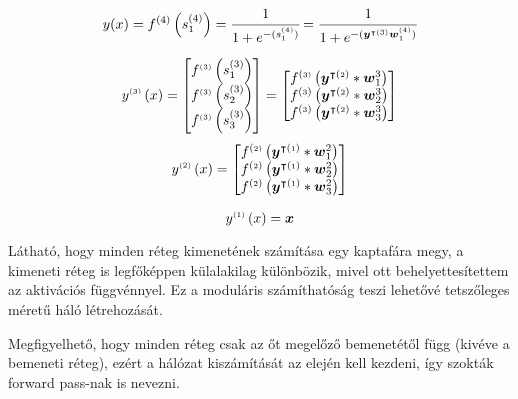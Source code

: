 \begin{equation}
    y(x) = f^{(4)}\left(s^{(4)}_1\right) = \cfrac{1}{1+e^{-(s^{(4)}_1)}} = \cfrac{1}{1+e^{-(\boldsymbol y^{\intercal {\scriptscriptstyle(3)}}\boldsymbol w^{{\scriptscriptstyle(4)}}_1)}}
\end{equation}

\begin{equation}
    y^{{\scriptscriptstyle(3)}}\left(x\right) =
    \begin{bmatrix}
    f^{{\scriptscriptstyle(3)}}\left(s^{(3)}_1\right) \\
    f^{{\scriptscriptstyle(3)}}\left(s^{(3)}_2\right) \\
    f^{{\scriptscriptstyle(3)}}\left(s^{(3)}_3\right)
    \end{bmatrix}
     = 
    \begin{bmatrix}
    f^{({\scriptscriptstyle3)}}\left(\boldsymbol y^{\intercal({\scriptscriptstyle2})}*\boldsymbol w^{3}_1\right) \\
    f^{({\scriptscriptstyle3})}\left(\boldsymbol y^{\intercal({\scriptscriptstyle2})}*\boldsymbol w^{3}_2\right) \\
    f^{({\scriptscriptstyle3})}\left(\boldsymbol y^{\intercal({\scriptscriptstyle2})}*\boldsymbol w^{3}_3\right)
    \end{bmatrix}
    \label{outputlayer}
\end{equation}
\begin{equation}
    y^{{\scriptscriptstyle(2)}}\left(x\right) =
    \begin{bmatrix}
    f^{({\scriptscriptstyle2)}}\left(\boldsymbol y^{\intercal({\scriptscriptstyle1})}*\boldsymbol w^{2}_1\right) \\
    f^{({\scriptscriptstyle2})}\left(\boldsymbol y^{\intercal({\scriptscriptstyle1})}*\boldsymbol w^{2}_2\right) \\
    f^{({\scriptscriptstyle2})}\left(\boldsymbol y^{\intercal({\scriptscriptstyle1})}*\boldsymbol w^{2}_3\right)
    \end{bmatrix}
\end{equation}

\begin{equation}
    y^{{\scriptscriptstyle(1)}}\left(x\right) = \boldsymbol x
\end{equation}


Látható, hogy minden réteg kimenetének számítása egy kaptafára megy, a kimeneti réteg is legfőképpen külalakilag különbözik, mivel ott behelyettesítettem az aktivációs függvénnyel. Ez a moduláris számíthatóság teszi lehetővé tetszőleges méretű háló létrehozását.

Megfigyelhető, hogy minden réteg csak az őt megelőző bemenetétől függ (kivéve a bemeneti réteg), ezért a hálózat kiszámítását az elején kell kezdeni, így szokták \foreignlanguage{english}{forward pass}-nak is nevezni.

